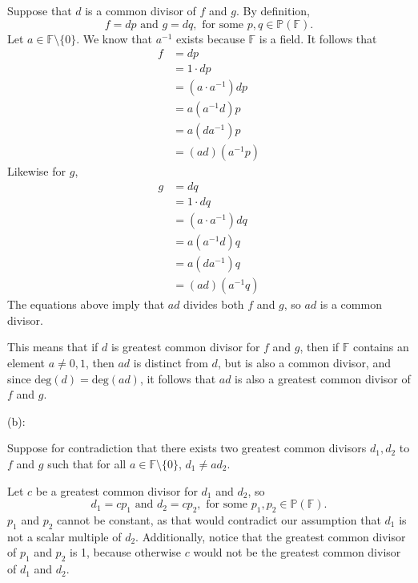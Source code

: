 \documentclass{article}
\theoremstyle{plain} %
\numberwithin{thm}{section} %
\theoremstyle{definition}
\begin{document}
\begin{question}{7}
        Suppose that \(d\) is a common divisor of \(f\) and \(g\). By definition,
        \[
            f = dp \text{ and } g = dq, \text{ for some } p, q \in \mathbb{P} (\mathbb{F}).
        \]
        Let \(a \in \mathbb{F} \setminus \{0\}\). We know that \(a ^{-1}\) exists because \(\mathbb{F}\) is a field. It follows that
        \begin{align*}
            f &= dp \\
            &= 1 \cdot dp \tag{additive identity} \\
            &= (a \cdot a ^{-1})dp \\
            &= a (a^{-1}d) p \tag{associativity} \\
            &= a(d a^{-1}) p \tag{commutativity} \\
            &= (ad)(a^{-1} p) \tag{associativity}
        \end{align*}
        Likewise for \(g\),
        \begin{align*}
            g &= dq \\
            &= 1 \cdot dq \tag{additive identity} \\
            &= (a \cdot a ^{-1})dq \\
            &= a (a^{-1}d) q \tag{associativity} \\
            &= a(d a^{-1}) q \tag{commutativity} \\
            &= (ad)(a^{-1} q) \tag{associativity}
        \end{align*}
        The equations above imply that \(ad\) divides both \(f\) and \(g\), so \(ad\) is a common divisor.

        This means that if \(d\) is greatest common divisor for \(f\) and \(g\), then if \(\mathbb{F}\) contains an element \(a \neq 0, 1\), then \(ad\) is distinct from \(d\), but is also a common divisor, and since \(\mathrm{deg} (d) = \mathrm{deg} (ad)\), it follows that \(ad\) is also a greatest common divisor of \(f\) and \(g\).

        \medskip

        (b):

        Suppose for contradiction that there exists two greatest common divisors \(d_1, d_2\) to \(f\) and \(g\) such that for all \(a \in \mathbb{F}\setminus \{0\}\), \(d_1 \neq ad_2\).

        Let \(c\) be a greatest common divisor for \(d_1\) and \(d_2\), so
        \[
            d_1 = c p_1 \text{ and } d_2 = c p_2, \text{ for some } p_1, p_2 \in \mathbb{P} (\mathbb{F}).
        \]
        \(p_1\) and \(p_2\) cannot be constant, as that would contradict our assumption that \(d_1\) is not a scalar multiple of \(d_2\). Additionally, notice that the greatest common divisor of \(p_1\) and \(p_2\) is 1, because otherwise \(c\) would not be the greatest common divisor of \(d_1\) and \(d_2\).


\end{question}
\end{document}
